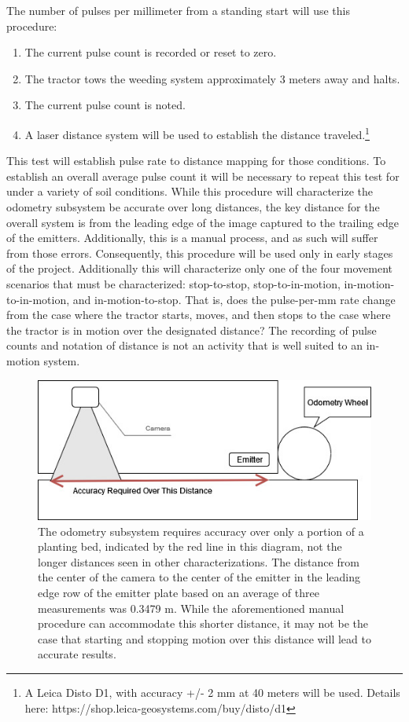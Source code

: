 \documentclass[12pt]{article}
\begin{document}
The number of pulses per millimeter from a standing start will use this procedure:
\begin{enumerate}
	\item{The current pulse count is recorded or reset to zero.}
	\item{The tractor tows the weeding system approximately 3 meters away and halts.}
	\item{The current pulse count is noted.}
	\item{A laser distance system will be used to establish the distance traveled.\footnote{A Leica Disto D1, with accuracy +/- 2 mm at 40 meters will be used.  Details here: https://shop.leica-geosystems.com/buy/disto/d1}}
\end{enumerate}
This test will establish pulse rate to distance mapping for those conditions. To establish an overall average pulse count it will be necessary to repeat this test for under a variety of soil conditions. While this procedure will characterize the odometry subsystem be accurate over long distances, the key distance for the overall system is  from the leading edge of the image captured to the trailing edge of the emitters.  Additionally, this is a manual process, and as such will suffer from those errors. Consequently, this procedure will be used only in early stages of the project.
Additionally this will characterize only one of the four movement scenarios that must be characterized: stop-to-stop, stop-to-in-motion, in-motion-to-in-motion, and in-motion-to-stop.  That is, does the pulse-per-mm rate change from the case where the tractor starts, moves, and then stops to the case where the tractor is in motion over the designated distance? The recording of pulse counts and notation of distance is not an activity that is well suited to an in-motion system.   

\begin{figure}[H]
	\centering
	\includegraphics[width=0.75\linewidth]{./figures/system-in-field.jpg}
	\caption[Accuracy required from odometry subsystem]{The odometry subsystem requires accuracy over only a portion of a planting bed, indicated by the red line in this diagram, not the longer distances seen in other characterizations. The distance from the center of the camera to the center of the emitter in the leading edge row of the emitter plate based on an average of three measurements was 0.3479 m. While the aforementioned manual procedure can accommodate this shorter distance, it may not be the case that starting and stopping motion over this distance will lead to accurate results.}
	\label{fig:required-accuracy}
\end{figure}
\end{document}
